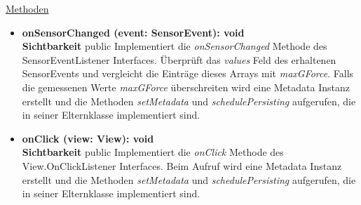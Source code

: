 \underline{Methoden}
\begin{itemize}
\itemsep0pt

\item \textbf{onSensorChanged (event: SensorEvent): void}\hfill\\
\textbf{Sichtbarkeit} public\newline
Implementiert die \textit{onSensorChanged} Methode des SensorEventListener Interfaces. Überprüft das \textit{values} Feld des erhaltenen SensorEvents und vergleicht die Einträge dieses Arrays mit \textit{maxGForce}. Falls die gemessenen Werte \textit{maxGForce} überschreiten wird eine Metadata Instanz erstellt und die Methoden \textit{setMetadata} und \textit{schedulePersisting} aufgerufen, die in seiner Elternklasse implementiert sind.

\item \textbf{onClick (view: View): void}\hfill\\
\textbf{Sichtbarkeit} public\newline
Implementiert die \textit{onClick} Methode des View.OnClickListener Interfaces. Beim Aufruf wird eine Metadata Instanz erstellt und die Methoden \textit{setMetadata} und \textit{schedulePersisting} aufgerufen, die in seiner Elternklasse implementiert sind.

\end{itemize}